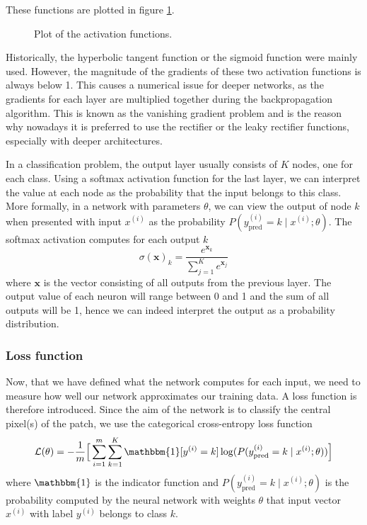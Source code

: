 \documentclass[12pt,a4paper,twoside,openright]{report}
\newlength\figureheight
\newlength\figurewidth
\begin{document}
These functions are plotted in figure \ref{fig:activation_functions}. 
\begin{figure}
	\centering 
	\setlength\figureheight{10cm}
	\setlength{}
	
	\caption{Plot of the activation functions.}
	\label{fig:activation_functions}
\end{figure}
Historically, the hyperbolic tangent function or the sigmoid function were mainly used. However, the magnitude of the gradients of these two activation functions is always below 1. This causes a numerical issue for deeper networks, as the gradients for each layer are multiplied together during the backpropagation algorithm. This is known as the vanishing gradient problem \cite{vanishing_gradients} and is the reason why nowadays it is preferred to use the rectifier or the leaky rectifier functions, especially with deeper architectures.

In a classification problem, the output layer usually consists of $K$ nodes, one for each class. Using a softmax activation function for the last layer, we can interpret the value at each node as the probability that the input belongs to this class.  More formally, in a network with parameters $\theta$, we can view the output of node $k$ when presented with input $x^{(i)}$ as the probability $P(y_{\text{pred}}^{(i)} = k \mid x^{(i)};\theta)$. The softmax activation computes for each output $k$
\begin{equation}
	\sigma(\mathbf{x})_k = \frac{e^{\mathbf{x}_k}}{\sum_{j=1}^{K}e^{\mathbf{x}_j}}
\end{equation}
where $\mathbf{x}$ is the vector consisting of all outputs from the previous layer. The output value of each neuron will range between 0 and 1 and the sum of all outputs will be 1, hence we can indeed interpret the output as a probability distribution.

\subsubsection{Loss function}
Now, that we have defined what the network computes for each input, we need to measure how well our network approximates our training data. A loss function is therefore introduced. Since the aim of the network is to classify the central pixel(s) of the patch, we use the categorical cross-entropy loss function
\begin{equation}
	\label{eq:loss}
	\mathcal{L}(\theta) = 
	- \frac{1}{m}\Big[\sum_{i=1}^m \sum_{k=1}^K\mathbbm{1}[y^{(i)} = k]\log(P(y_{\text{pred}}^{(i)}=k \mid x^{(i)};\theta))\Big]
\end{equation}
where $\mathbbm{1}$ is the indicator function and $P(y_{\text{pred}}^{(i)}=k \mid x^{(i)};\theta)$ is the probability computed by the neural network with weights $\theta$ that input vector $x^{(i)}$ with label $y^{(i)}$ belongs to class $k$.
\end{document}
